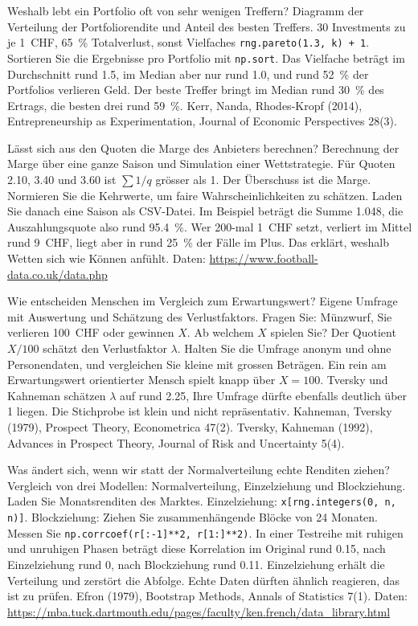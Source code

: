 {Weshalb lebt ein Portfolio oft von sehr wenigen Treffern?}
{Diagramm der Verteilung der Portfoliorendite und Anteil des besten Treffers.}
{30 Investments zu je 1~CHF, 65~\% Totalverlust, sonst Vielfaches \texttt{rng.pareto(1.3, k) + 1}. Sortieren Sie die Ergebnisse pro Portfolio mit \texttt{np.sort}.}
{Das Vielfache beträgt im Durchschnitt rund 1.5, im Median aber nur rund 1.0, und rund 52~\% der Portfolios verlieren Geld. Der beste Treffer bringt im Median rund 30~\% des Ertrags, die besten drei rund 59~\%.}
{Kerr, Nanda, Rhodes-Kropf (2014), Entrepreneurship as Experimentation, Journal of Economic Perspectives 28(3).}

{Lässt sich aus den Quoten die Marge des Anbieters berechnen?}
{Berechnung der Marge über eine ganze Saison und Simulation einer Wettstrategie.}
{Für Quoten 2.10, 3.40 und 3.60 ist $\sum 1/q$ grösser als 1. Der Überschuss ist die Marge. Normieren Sie die Kehrwerte, um faire Wahrscheinlichkeiten zu schätzen. Laden Sie danach eine Saison als CSV-Datei.}
{Im Beispiel beträgt die Summe 1.048, die Auszahlungsquote also rund 95.4~\%. Wer 200-mal 1~CHF setzt, verliert im Mittel rund 9~CHF, liegt aber in rund 25~\% der Fälle im Plus. Das erklärt, weshalb Wetten sich wie Können anfühlt.}
{Daten: \url{https://www.football-data.co.uk/data.php}}

{Wie entscheiden Menschen im Vergleich zum Erwartungswert?}
{Eigene Umfrage mit Auswertung und Schätzung des Verlustfaktors.}
{Fragen Sie: Münzwurf, Sie verlieren 100~CHF oder gewinnen $X$. Ab welchem $X$ spielen Sie? Der Quotient $X/100$ schätzt den Verlustfaktor $\lambda$. Halten Sie die Umfrage anonym und ohne Personendaten, und vergleichen Sie kleine mit grossen Beträgen.}
{Ein rein am Erwartungswert orientierter Mensch spielt knapp über $X = 100$. Tversky und Kahneman schätzen $\lambda$ auf rund 2.25, Ihre Umfrage dürfte ebenfalls deutlich über 1 liegen. Die Stichprobe ist klein und nicht repräsentativ.}
{Kahneman, Tversky (1979), Prospect Theory, Econometrica 47(2). Tversky, Kahneman (1992), Advances in Prospect Theory, Journal of Risk and Uncertainty 5(4).}

{Was ändert sich, wenn wir statt der Normalverteilung echte Renditen ziehen?}
{Vergleich von drei Modellen: Normalverteilung, Einzelziehung und Blockziehung.}
{Laden Sie Monatsrenditen des Marktes. Einzelziehung: \texttt{x[rng.integers(0, n, n)]}. Blockziehung: Ziehen Sie zusammenhängende Blöcke von 24 Monaten. Messen Sie \texttt{np.corrcoef(r[:-1]**2, r[1:]**2)}.}
{In einer Testreihe mit ruhigen und unruhigen Phasen beträgt diese Korrelation im Original rund 0.15, nach Einzelziehung rund 0, nach Blockziehung rund 0.11. Einzelziehung erhält die Verteilung und zerstört die Abfolge. Echte Daten dürften ähnlich reagieren, das ist zu prüfen.}
{Efron (1979), Bootstrap Methods, Annals of Statistics 7(1). Daten: \url{https://mba.tuck.dartmouth.edu/pages/faculty/ken.french/data_library.html}}

